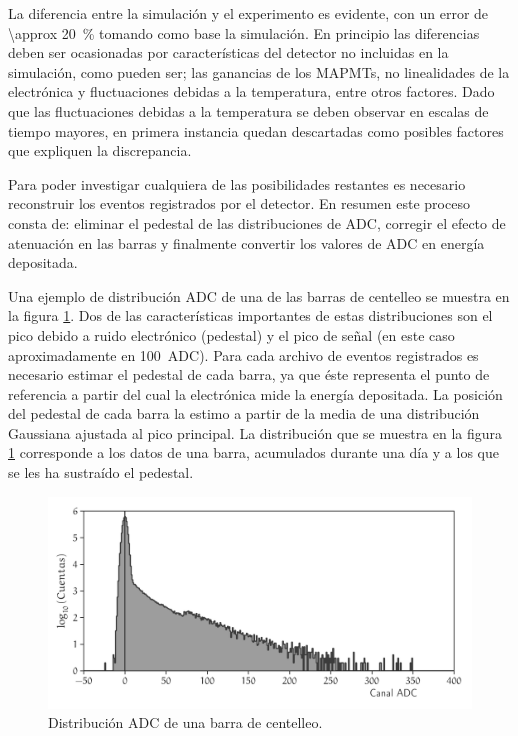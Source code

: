 La diferencia entre la simulación y el experimento es evidente, con un error de \SI{\approx 20}{\percent} tomando como base la simulación. En principio las diferencias deben ser ocasionadas por características del detector no incluidas en la simulación, como pueden ser; las ganancias de los MAPMTs, no linealidades de la electrónica y fluctuaciones debidas a la temperatura, entre otros factores. Dado que las fluctuaciones debidas a la temperatura se deben observar en escalas de tiempo mayores, en primera instancia quedan descartadas como posibles factores que expliquen la discrepancia.

Para poder investigar cualquiera de las posibilidades restantes es necesario reconstruir los eventos registrados por el detector. En resumen este proceso consta de: eliminar el pedestal de las distribuciones de ADC, corregir el efecto de atenuación en las barras y finalmente convertir los valores de ADC en energía depositada.

Una ejemplo de distribución ADC de una de las barras de centelleo se muestra en la figura \ref{fig:neutron-pedestal}. Dos de las características importantes de estas distribuciones son el pico debido a ruido electrónico (pedestal) y el pico de señal (en este caso aproximadamente en \SI{100}{ADC}). Para cada archivo de eventos registrados es necesario estimar el pedestal de cada barra, ya que éste representa el punto de referencia a partir del cual la electrónica mide la energía depositada. La posición del pedestal de cada barra la estimo a partir de la media de una distribución Gaussiana ajustada al pico principal. La distribución que se muestra en la figura \ref{fig:neutron-pedestal} corresponde a los datos de una barra, acumulados durante una día y a los que se les ha sustraído el pedestal.

\begin{figure}
        \centering
        \includegraphics[width=\textwidth]{neutron-ped.pdf}
        \caption{Distribución ADC de una barra de centelleo.}
        \label{fig:neutron-pedestal}
\end{figure}

